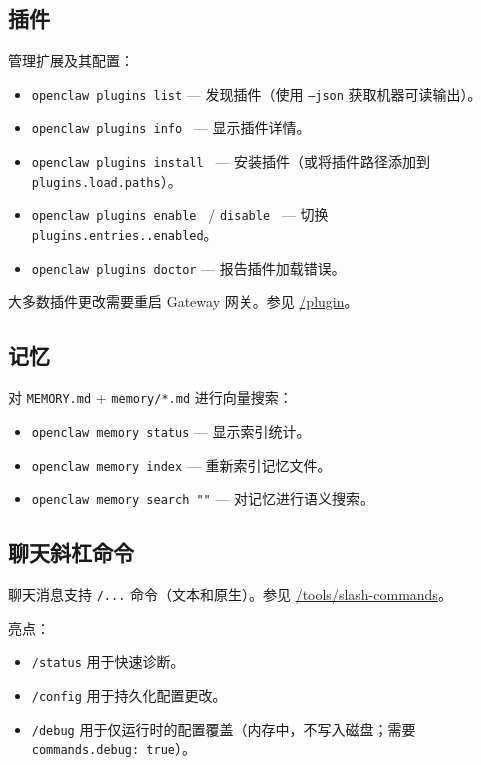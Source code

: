 \subsection{插件}


管理扩展及其配置：

\begin{itemize}
  \item \texttt{openclaw plugins list} — 发现插件（使用 \texttt{--json} 获取机器可读输出）。
  \item \texttt{openclaw plugins info } — 显示插件详情。
  \item \texttt{openclaw plugins install } — 安装插件（或将插件路径添加到 \texttt{plugins.load.paths}）。
  \item \texttt{openclaw plugins enable } / \texttt{disable } — 切换 \texttt{plugins.entries..enabled}。
  \item \texttt{openclaw plugins doctor} — 报告插件加载错误。
\end{itemize}


大多数插件更改需要重启 Gateway 网关。参见 \href{/tools/plugin}{/plugin}。

\subsection{记忆}


对 \texttt{MEMORY.md} + \texttt{memory/*.md} 进行向量搜索：

\begin{itemize}
  \item \texttt{openclaw memory status} — 显示索引统计。
  \item \texttt{openclaw memory index} — 重新索引记忆文件。
  \item \texttt{openclaw memory search ""} — 对记忆进行语义搜索。
\end{itemize}


\subsection{聊天斜杠命令}


聊天消息支持 \texttt{/...} 命令（文本和原生）。参见 \href{/tools/slash-commands}{/tools/slash-commands}。

亮点：

\begin{itemize}
  \item \texttt{/status} 用于快速诊断。
  \item \texttt{/config} 用于持久化配置更改。
  \item \texttt{/debug} 用于仅运行时的配置覆盖（内存中，不写入磁盘；需要 \texttt{commands.debug: true}）。
\end{itemize}


